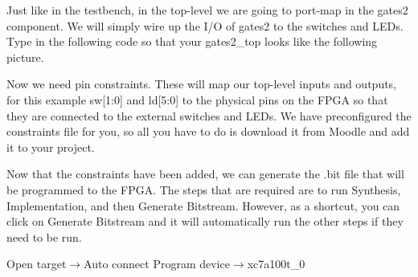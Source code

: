 
Just like in the testbench, in the top-level we are going to port-map in the gates2 component.
We will simply wire up the I/O of gates2 to the switches and LEDs.
Type in the following code so that your gates2\_top looks like the following picture.


Now we need pin constraints.
These will map our top-level inputs and outputs, for this example sw[1:0] and ld[5:0] to the
physical pins on the FPGA so that they are connected to the external switches and LEDs.
We have preconfigured the constraints file for you, so all you have to do is download it from
Moodle and add it to your project.


Now that the constraints have been added, we can generate the .bit file that will be
programmed to the FPGA.
The steps that are required are to run Synthesis, Implementation, and then Generate Bitstream.
However, as a shortcut, you can click on Generate Bitstream and it will automatically run the
other steps if they need to be run.

Open target$\rightarrow$Auto connect
Program device$\rightarrow$xc7a100t\_0


